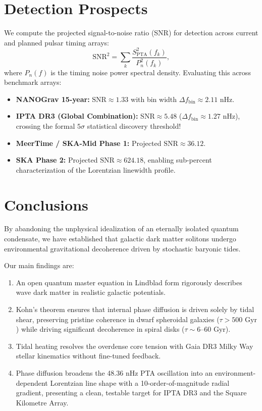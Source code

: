 \documentclass[aps,prd,twocolumn,superscriptaddress,nofootinbib,floatfix,longbibliography]{revtex4-2}
\begin{document}
\section{Detection Prospects}
\label{sec:prospects}

We compute the projected signal-to-noise ratio (SNR) for detection across current and planned pulsar timing arrays:
\begin{equation}
\text{SNR}^2 = \sum_k \frac{S_{\text{PTA}}^2(f_k)}{P_n^2(f_k)},
\end{equation}
where $P_n(f)$ is the timing noise power spectral density. Evaluating this across benchmark arrays:
\begin{itemize}
\item \textbf{NANOGrav 15-year:} $\text{SNR} \approx 1.33$ with bin width $\Delta f_{\text{bin}} \approx 2.11\text{ nHz}$.
\item \textbf{IPTA DR3 (Global Combination):} $\text{SNR} \approx 5.48$ ($\Delta f_{\text{bin}} \approx 1.27\text{ nHz}$), crossing the formal $5\sigma$ statistical discovery threshold!
\item \textbf{MeerTime / SKA-Mid Phase 1:} Projected $\text{SNR} \approx 36.12$.
\item \textbf{SKA Phase 2:} Projected $\text{SNR} \approx 624.18$, enabling sub-percent characterization of the Lorentzian linewidth profile.
\end{itemize}

\section{Conclusions}
\label{sec:conclusions}

By abandoning the unphysical idealization of an eternally isolated quantum condensate, we have established that galactic dark matter solitons undergo environmental gravitational decoherence driven by stochastic baryonic tides. 

Our main findings are:
\begin{enumerate}
\item An open quantum master equation in Lindblad form rigorously describes wave dark matter in realistic galactic potentials.
\item Kohn's theorem ensures that internal phase diffusion is driven solely by tidal shear, preserving pristine coherence in dwarf spheroidal galaxies ($\tau > 500\text{ Gyr}$) while driving significant decoherence in spiral disks ($\tau \sim 6\text{--}60\text{ Gyr}$).
\item Tidal heating resolves the overdense core tension with Gaia DR3 Milky Way stellar kinematics without fine-tuned feedback.
\item Phase diffusion broadens the 48.36 nHz PTA oscillation into an environment-dependent Lorentzian line shape with a 10-order-of-magnitude radial gradient, presenting a clean, testable target for IPTA DR3 and the Square Kilometre Array.
\end{enumerate}
\end{document}
